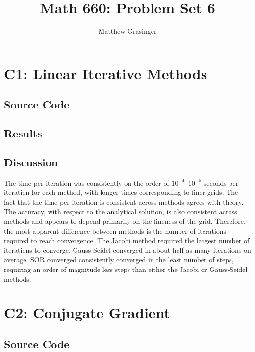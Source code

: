 \documentclass[a4paper,10pt]{article}
\title{Math 660: Problem Set 6}
\author{Matthew Grasinger}
\begin{document}
  \maketitle

	\section{C1: Linear Iterative Methods} \label{sec:c1}
	
	\subsection{Source Code}
	
	
	
	\subsection{Results}
	
	
	\subsection{Discussion}
	
	The time per iteration was consistently on the order of $10^{-4}$--$10^{-5}$ seconds per iteration for each method, with longer times corresponding to finer grids.
	The fact that the time per iteration is consistent across methods agrees with theory.
	The accuracy, with respect to the analytical solution, is also consistent across methods and appears to depend primarily on the fineness of the grid.
	Therefore, the most apparent difference between methods is the number of iterations required to reach convergence.
	The Jacobi method required the largest number of iterations to converge.
	Gauss-Seidel converged in about half as many iterations on average.
	SOR converged consistently converged in the least number of steps, requiring an order of magnitude less steps than either the Jacobi or Gauss-Seidel methods.
	
	\section{C2: Conjugate Gradient}
	
	\subsection{Source Code}
	
\end{document}
